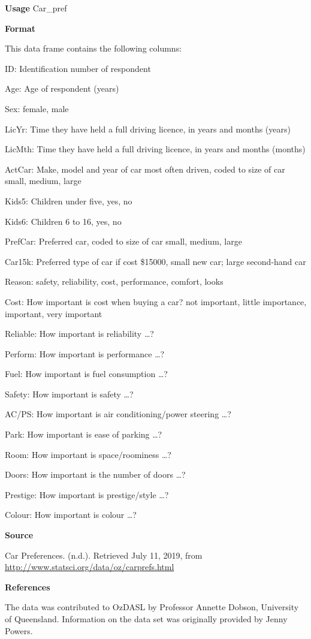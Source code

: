 \documentclass[
]{book}
\begin{document}
\textbf{Usage}
Car\_pref

\textbf{Format}

This data frame contains the following columns:

ID: Identification number of respondent

Age: Age of respondent (years)

Sex: female, male

LicYr: Time they have held a full driving licence, in years and months (years)

LicMth: Time they have held a full driving licence, in years and months (months)

ActCar: Make, model and year of car most often driven, coded to size of car small, medium, large

Kids5: Children under five, yes, no

Kids6: Children 6 to 16, yes, no

PrefCar: Preferred car, coded to size of car small, medium, large

Car15k: Preferred type of car if cost \$15000, small new car; large second-hand car

Reason: safety, reliability, cost, performance, comfort, looks

Cost: How important is cost when buying a car? not important, little importance, important, very important

Reliable: How important is reliability \ldots?

Perform: How important is performance \ldots?

Fuel: How important is fuel consumption \ldots?

Safety: How important is safety \ldots?

AC/PS: How important is air conditioning/power steering \ldots?

Park: How important is ease of parking \ldots?

Room: How important is space/roominess \ldots?

Doors: How important is the number of doors \ldots?

Prestige: How important is prestige/style \ldots?

Colour: How important is colour \ldots?

\textbf{Source}

Car Preferences. (n.d.). Retrieved July 11, 2019, from \url{http://www.statsci.org/data/oz/carprefs.html}

\textbf{References}

The data was contributed to OzDASL by Professor Annette Dobson, University of Queensland. Information on the data set was originally provided by Jenny Powers.
\end{document}
